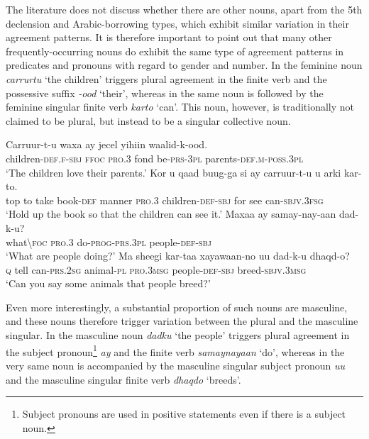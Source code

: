 \documentclass[output=paper]{langsci/langscibook}
\begin{document}
The literature does not discuss whether there are other nouns, apart from the 5th declension and Arabic-borrowing types, which exhibit similar variation in their agreement patterns. It is therefore important to point out that many other frequently-occurring nouns do exhibit the same type of agreement patterns in predicates and pronouns with regard to gender and number. In  the feminine noun \textit{carrurtu} ‘the children’ triggers plural agreement in the finite verb and the possessive suffix \textit{-ood} ‘their’, whereas in  the same noun is followed by the feminine singular finite verb \textit{karto} ‘can’. This noun, however, is traditionally not claimed to be plural, but instead to be a singular collective noun.

\ea\label{ex:nilsson:3}
\ea\label{ex:nilsson:3a}
\gll Carruur-t-u          waxa ay      jecel  yihiin           waalid-k-ood.\\
       children-\textsc{def.f-sbj} \textsc{ffoc} \textsc{pro.3} fond  be\textsc{-prs-3pl} parents-\textsc{def.m}-\textsc{poss.3pl}\\
\glt ‘The children love their parents.’
\ex\label{ex:nilsson:3b}
\gll Kor u qaad buug-ga  si          ay      carruur-t-u          u   arki kar-to.\\
     top to take book-\textsc{def} manner \textsc{pro.3} children-\textsc{def-sbj} for see can-\textsc{sbjv.3fsg}\\
\glt ‘Hold up the book so that the children can see it.’
\ex\label{ex:nilsson:3c}
\gll Maxaa     ay          samay-nay-aan     dad-k-u?\\
       what{\textbackslash}\textsc{foc pro.3}  do-\textsc{prog-prs.3pl}  people\textsc{-def-sbj}\\
\glt ‘What are people doing?’
\ex\label{ex:nilsson:3d}
\gll Ma sheegi kar-taa         xayawaan-no  uu        dad-k-u             dhaqd-o?\\
       \textsc{q}     tell     can-\textsc{prs.2sg} animal\textsc{-pl}  \textsc{pro.3msg}  people\textsc{-def-sbj} breed-\textsc{sbjv.3msg}\\
\glt ‘Can you say some animals that people breed?’
\z
\z

Even more interestingly, a substantial proportion of such nouns are masculine, and these nouns therefore trigger variation between the plural and the masculine singular. In  the masculine noun \textit{dadku} ‘the people’ triggers plural agreement in the subject pronoun\footnote{Subject pronouns are used in positive statements even if there is a subject noun.} \textit{ay} and the finite verb \textit{samaynayaan} ‘do’, whereas in  the very same noun is accompanied by the masculine singular subject pronoun \textit{uu} and the masculine singular finite verb \textit{dhaqdo} ‘breeds’. 
\end{document}
